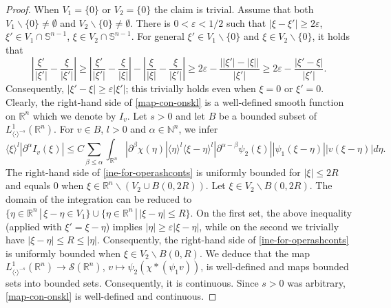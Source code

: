 \documentclass[12pt,reqno]{amsart}
\newcommand{\NN}{\mathbb N}
\newcommand{\RR}{\mathbb R}
\newcommand{\SSS}{\mathcal S}
\theoremstyle{plain}
\theoremstyle{remark}
\theoremstyle{definition}
\numberwithin{equation}{section}
\begin{document}
\begin{proof}
When $V_1=\{0\}$ or $V_2=\{0\}$ the claim is trivial. Assume that both $V_1\backslash\{0\}\neq \emptyset$ and $V_2\backslash\{0\}\neq\emptyset$. There is $0<\varepsilon<1/2$ such that $|\xi-\xi'|\geq 2\varepsilon$, $\xi'\in V_1\cap\mathbb{S}^{n-1}$, $\xi\in V_2\cap\mathbb{S}^{n-1}$. For general $\xi'\in V_1\backslash\{0\}$ and $\xi\in V_2\backslash\{0\}$, it holds that
\begin{equation*}
\left|\frac{\xi'}{|\xi'|}-\frac{\xi}{|\xi'|}\right|\geq \left|\frac{\xi'}{|\xi'|}-\frac{\xi}{|\xi|}\right|-\left|\frac{\xi}{|\xi|}-\frac{\xi}{|\xi'|}\right|\geq 2\varepsilon-\frac{\left||\xi'|-|\xi|\right|}{|\xi'|}\geq 2\varepsilon-\frac{|\xi'-\xi|}{|\xi'|}.
\end{equation*}
Consequently, $|\xi'-\xi|\geq \varepsilon|\xi'|$; this trivially holds even when $\xi=0$ or $\xi'=0$.\\
\indent Clearly, the right-hand side of \eqref{map-con-onskl} is a well-defined smooth function on $\RR^n$ which we denote by $I_v$. Let $s>0$ and let $B$ be a bounded subset of $L^1_{\langle\cdot\rangle^{-s}}(\RR^n)$. For $v\in B$, $l>0$ and $\alpha\in\NN^n$, we infer
\begin{equation}\label{ine-for-operashconts}
\langle\xi\rangle^l|\partial^{\alpha}I_v(\xi)|\leq C\sum_{\beta\leq \alpha} \int_{\RR^n}|\partial^{\beta}\chi(\eta)|\langle\eta\rangle^l\langle\xi-\eta\rangle^l|\partial^{\alpha-\beta}\psi_2(\xi)| |\psi_1(\xi-\eta)||v(\xi-\eta)|d\eta.
\end{equation}
The right-hand side of \eqref{ine-for-operashconts} is uniformly bounded for $|\xi|\leq 2R$ and equals $0$ when $\xi\in \RR^n\backslash (V_2\cup B(0,2R))$. Let $\xi\in V_2\backslash B(0,2R)$. The domain of the integration can be reduced to $\{\eta\in\RR^n\,|\,\xi-\eta\in V_1\}\cup\{\eta\in\RR^n\,|\, |\xi-\eta|\leq R\}$. On the first set, the above inequality (applied with $\xi'=\xi-\eta$) implies $|\eta|\geq \varepsilon|\xi-\eta|$, while on the second we trivially have $|\xi-\eta|\leq R\leq |\eta|$. Consequently, the right-hand side of \eqref{ine-for-operashconts} is uniformly bounded when $\xi\in V_2\backslash B(0,R)$. We deduce that the map $L^1_{\langle \cdot\rangle^{-s}}(\RR^n)\rightarrow \SSS(\RR^n)$, $v\mapsto \psi_2(\chi*(\psi_1v))$, is well-defined and maps bounded sets into bounded sets. Consequently, it is continuous. Since $s>0$ was arbitrary, \eqref{map-con-onskl} is well-defined and continuous.
\end{proof}
\end{document}
